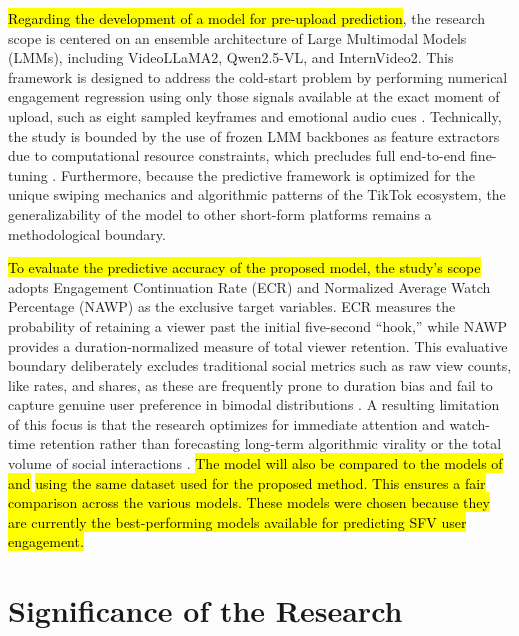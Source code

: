 \hl{Regarding the development of a model for pre-upload prediction}, the research scope is centered on an ensemble architecture of Large Multimodal Models (LMMs), including VideoLLaMA2, Qwen2.5-VL, and InternVideo2. This framework is designed to address the cold-start problem by performing numerical engagement regression using only those signals available at the exact moment of upload, such as eight sampled keyframes and emotional audio cues \cite{sun2025engagement}. Technically, the study is bounded by the use of frozen LMM backbones as feature extractors due to computational resource constraints, which precludes full end-to-end fine-tuning \cite{li2025vquala}. Furthermore, because the predictive framework is optimized for the unique swiping mechanics and algorithmic patterns of the TikTok ecosystem, the generalizability of the model to other short-form platforms remains a methodological boundary.

\hl{To evaluate the predictive accuracy of the proposed model, the study’s scope} adopts Engagement Continuation Rate (ECR) and Normalized Average Watch Percentage (NAWP) as the exclusive target variables. ECR measures the probability of retaining a viewer past the initial five-second ``hook,'' while NAWP provides a duration-normalized measure of total viewer retention. This evaluative boundary deliberately excludes traditional social metrics such as raw view counts, like rates, and shares, as these are frequently prone to duration bias and fail to capture genuine user preference in bimodal distributions \cite{sun2025engagement}. A resulting limitation of this focus is that the research optimizes for immediate attention and watch-time retention rather than forecasting long-term algorithmic virality or the total volume of social interactions \cite{li2024delving}. \hl{The model will also be compared to the models of} \citeauthor{sun2025engagement} \hl{and} \citeauthor{guan2025mmf} \hl{using the same dataset used for the proposed method. This ensures a fair comparison across the various models. These models were chosen because they are currently the best-performing models available for predicting SFV user engagement.}


\section{Significance of the Research}



